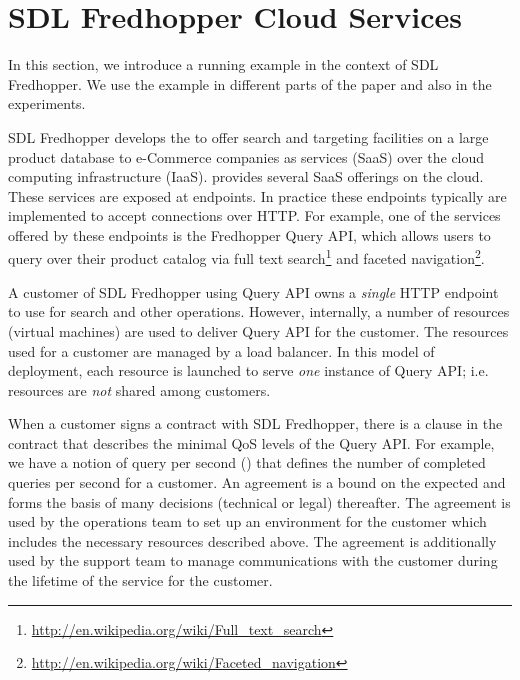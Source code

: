 
\section{SDL Fredhopper Cloud Services} %
\label{ch04:sec:fredhopper_example}

In this section, we introduce a running example in the context of SDL Fredhopper. 
We use the example in different parts of the paper and also in the experiments.

SDL Fredhopper develops the \frhcsp to offer search and targeting facilities on a large product database to e-Commerce companies as services (SaaS) over the cloud computing infrastructure (IaaS).  
\frhcsp provides several SaaS offerings on the cloud. 
These services are exposed at endpoints. 
In practice these endpoints typically are implemented to accept connections over HTTP.
For example, one of the services offered by these endpoints is the Fredhopper Query API, which allows users to query over their product catalog via full text search\footnote{\url{http://en.wikipedia.org/wiki/Full_text_search}} and faceted navigation\footnote{\url{http://en.wikipedia.org/wiki/Faceted_navigation}}.

A customer of SDL Fredhopper using Query API owns a \emph{single} HTTP endpoint to use for search and other operations.
However, internally, a number of resources (virtual machines) are used to deliver Query API for the customer.
The %
resources used for a customer are managed by a load balancer.
In this model of deployment, each resource is launched to serve \emph{one} instance of Query API; i.e. resources are \emph{not} shared among customers.

When a customer signs a contract with SDL Fredhopper, there is a clause in the contract that describes the minimal QoS levels of the
Query API.
For example, we have a notion of query per second (\qps) that defines the number of completed queries per second for a customer. 
An agreement is a bound on the expected \qps and forms
the basis of many decisions (technical or legal) thereafter. 
The agreement is used by the operations team to set up an environment for the customer which includes the necessary resources described above.
The agreement is additionally used by the support team to manage communications with the customer during the lifetime of the service for the customer.
% 

